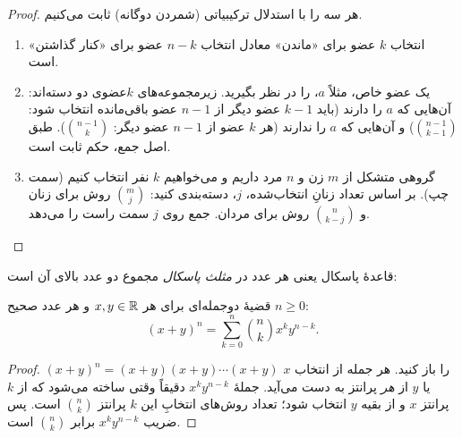 \begin{proof}
هر سه را با استدلال ترکیبیاتی (شمردن دوگانه) ثابت می‌کنیم.
\begin{enumerate}
  \item انتخاب $k$ عضو برای «ماندن» معادل انتخاب $n-k$ عضو برای «کنار گذاشتن» است.
  \item یک عضو خاص، مثلاً $a$، را در نظر بگیرید. زیرمجموعه‌های $k$عضوی دو دسته‌اند: آن‌هایی که $a$ را دارند (باید $k-1$ عضو دیگر از $n-1$ عضو باقی‌مانده انتخاب شود: $\binom{n-1}{k-1}$) و آن‌هایی که $a$ را ندارند (هر $k$ عضو از $n-1$ عضو دیگر: $\binom{n-1}{k}$). طبق اصل جمع، حکم ثابت است.
  \item گروهی متشکل از $m$ زن و $n$ مرد داریم و می‌خواهیم $k$ نفر انتخاب کنیم (سمت چپ). بر اساس تعداد زنانِ انتخاب‌شده، $j$، دسته‌بندی کنید: $\binom mj$ روش برای زنان و $\binom n{k-j}$ روش برای مردان. جمع روی $j$ سمت راست را می‌دهد.
\end{enumerate}
\end{proof}

قاعدهٔ پاسکال یعنی هر عدد در \emph{مثلث پاسکال} مجموع دو عدد بالای آن است:

\begin{figblock}

\end{figblock}

\begin{theorem}[label=thm:binomial]{قضیهٔ دوجمله‌ای}
برای هر $x,y\in\mathbb{R}$ و هر عدد صحیح $n\ge0$:
\[ (x+y)^n=\sum_{k=0}^{n}\binom nk x^k y^{n-k}. \]
\end{theorem}

\begin{proof}
$(x+y)^n=(x+y)(x+y)\cdots(x+y)$ را باز کنید. هر جمله از انتخاب $x$ یا $y$ از \emph{هر} پرانتز به دست می‌آید. جملهٔ $x^ky^{n-k}$ دقیقاً وقتی ساخته می‌شود که از $k$ پرانتز $x$ و از بقیه $y$ انتخاب شود؛ تعداد روش‌های انتخابِ این $k$ پرانتز $\binom nk$ است. پس ضریب $x^ky^{n-k}$ برابر $\binom nk$ است.
\end{proof}

